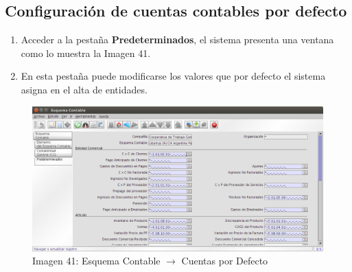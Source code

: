 \documentclass[letterpaper,10pt,spanish]{sphinxmanual}
\begin{document}
\subsection{Configuración de cuentas contables por defecto}
\label{contabilidad:configuracion-de-cuentas-contables-por-defecto}\begin{enumerate}
\item {} 
Acceder a la pestaña \textbf{Predeterminados}, el sistema presenta una ventana como lo muestra la Imagen 41.

\item {} 
En esta pestaña puede modificarse los valores que por defecto el sistema asigna en el alta de entidades.

\end{enumerate}
\begin{figure}[htbp]
\centering
\capstart

\includegraphics{ly_contabilidad_41.png}
\caption{Imagen 41: Esquema Contable \(\rightarrow\) Cuentas por Defecto}\end{figure}
\end{document}

